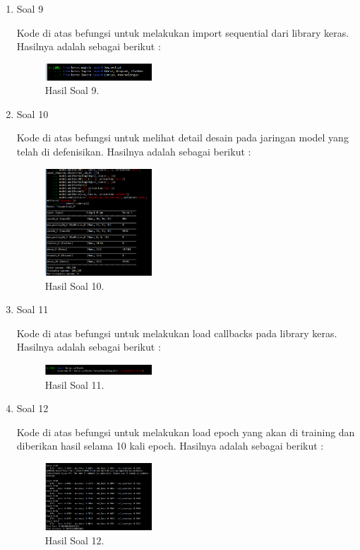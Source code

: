 \begin{enumerate}
	\item Soal 9
	\hfill\break
	
	Kode di atas befungsi untuk melakukan import sequential dari library keras. Hasilnya adalah sebagai berikut : 
	\begin{figure}[H]
	\centering
		\includegraphics[width=4cm]{figures/1174080/7/materi/hasil9.PNG}
		\caption{Hasil Soal 9.}
	\end{figure}

	\item Soal 10
	\hfill\break
	
	Kode di atas befungsi untuk melihat detail desain pada jaringan model yang telah di defenisikan. Hasilnya adalah sebagai berikut : 
	\begin{figure}[H]
	\centering
		\includegraphics[width=4cm]{figures/1174080/7/materi/hasil10.PNG}
		\caption{Hasil Soal 10.}
	\end{figure}

	\item Soal 11
	\hfill\break
	
	Kode di atas befungsi untuk melakukan load callbacks pada library keras. Hasilnya adalah sebagai berikut : 
	\begin{figure}[H]
	\centering
		\includegraphics[width=4cm]{figures/1174080/7/materi/hasil11.PNG}
		\caption{Hasil Soal 11.}
	\end{figure}

	\item Soal 12
	\hfill\break
	
	Kode di atas befungsi untuk melakukan load epoch yang akan di training dan diberikan hasil selama 10 kali epoch. Hasilnya adalah sebagai berikut :  
	\begin{figure}[H]
	\centering
		\includegraphics[width=4cm]{figures/1174080/7/materi/hasil12.PNG}
		\caption{Hasil Soal 12.}
	\end{figure}


\end{enumerate}
